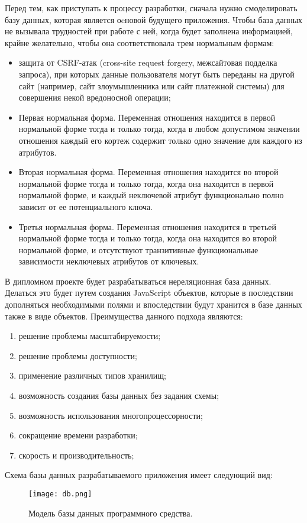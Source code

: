 Перед тем, как приступать к процессу разработки, сначала нужно смоделировать базу данных, которая является оcновой будущего приложения. Чтобы база данных не вызывала трудностей при работе с ней, когда будет заполнена информацией, крайне желательно, чтобы она соответствовала трем нормальным формам:
\begin{itemize}
  \item защита от CSRF-атак (cross-site request forgery, межсайтовая подделка запроса), при которых данные пользователя могут быть переданы на другой сайт (например, сайт злоумышленника или сайт платежной системы) для совершения некой вредоносной операции;
  \item Первая нормальная форма. Переменная отношения находится в первой нормальной форме тогда и только тогда, когда в любом допустимом значении отношения каждый его кортеж содержит только одно значение для каждого из атрибутов. 
  \item Вторая нормальная форма. Переменная отношения находится во второй нормальной форме тогда и только тогда, когда она находится в первой нормальной форме, и каждый неключевой атрибут функционально полно зависит от ее потенциального ключа.
  \item Третья нормальная форма. Переменная отношения находится в третьей нормальной форме тогда и только тогда, когда она находится во второй нормальной форме, и отсутствуют транзитивные функциональные зависимости неключевых атрибутов от ключевых.
\end{itemize}
В дипломном проекте будет разрабатываться нереляционная база данных. Делаться это будет путем создания JavaScript объектов, которые в последствии дополняться необходимыми полями и впоследствии будут хранится в базе данных также в виде объектов. Преимущества данного подхода являются: 
\begin{enumerate}
  \item решение проблемы масштабируемости;
  \item решение проблемы доступности;
  \item применение различных типов хранилищ;
  \item возможность создания базы данных без задания схемы;
  \item возможность использования многопроцессорности;
  \item сокращение времени разработки;
  \item скорость и производительность;
\end{enumerate}
Схема базы данных разрабатываемого приложения имеет следующий вид:
\begin{figure}[ht]
\centering
  \texttt{[image: db.png]}  
  \caption{ Модель базы данных программного средства. }
  \label{fig:domain:manual_structure:credit_db}
\end{figure}

